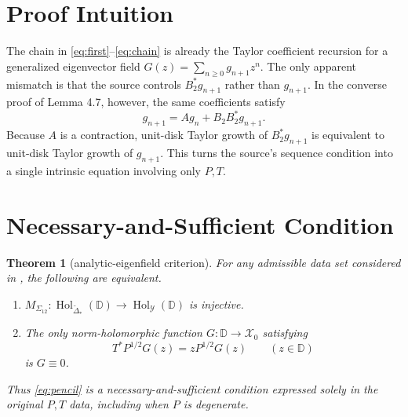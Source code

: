 \documentclass[11pt]{article}
\newtheorem{theorem}{Theorem}
\newcommand{\D}{\mathbb D}
\newcommand{\Hol}{\operatorname{Hol}}
\begin{document}
\section*{Proof Intuition}

The chain in \eqref{eq:first}--\eqref{eq:chain} is already the Taylor
coefficient recursion for a generalized eigenvector field
$G(z)=\sum_{n\geq0}g_{n+1}z^n$.  The only apparent mismatch is that the
source controls $B_2^*g_{n+1}$ rather than $g_{n+1}$.  In the converse proof
of Lemma 4.7, however, the same coefficients satisfy
\[
 g_{n+1}=Ag_n+B_2B_2^*g_{n+1}.
\]
Because $A$ is a contraction, unit-disk Taylor growth of $B_2^*g_{n+1}$ is
equivalent to unit-disk Taylor growth of $g_{n+1}$.  This turns the source's
sequence condition into a single intrinsic equation involving only $P,T$.

\section*{Necessary-and-Sufficient Condition}

\begin{theorem}[analytic-eigenfield criterion]\label{thm:main}
For any admissible data set considered in \cite{BBH}, the following are
equivalent.
\begin{enumerate}
\item $M_{\Sigma_{12}}:\Hol_{\widetilde\Delta_*}(\D)
\to\Hol_{\mathcal Y}(\D)$ is injective.
\item The only norm-holomorphic function $G:\D\to\mathcal X_0$ satisfying
\begin{equation}\label{eq:pencil}
 T^*P^{1/2}G(z)=zP^{1/2}G(z)\qquad(z\in\D)
\end{equation}
is $G\equiv0$.
\end{enumerate}
Thus \eqref{eq:pencil} is a necessary-and-sufficient condition expressed
solely in the original $P,T$ data, including when $P$ is degenerate.
\end{theorem}
\end{document}
